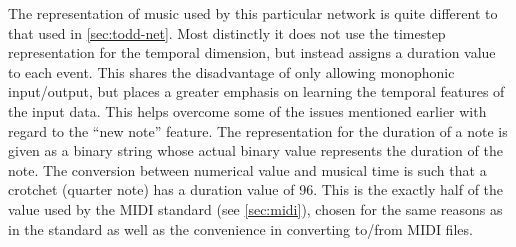 \documentclass[ author={Stephen Livermore-Tozer},
				supervisor={Dr. Peter Flach},
				degree={MEng},
				title={Algorithmic Co-composition Using Machine Learning},
				subtitle={},
				type={research},
				year={2016} ]{dissertation}
\begin{document}
	
	The representation of music used by this particular network is quite different to that used in \ref{sec:todd-net}. Most distinctly it does not use the timestep representation for the temporal dimension, but instead assigns a duration value to each event. This shares the disadvantage of only allowing monophonic input/output, but places a greater emphasis on learning the temporal features of the input data. This helps overcome some of the issues mentioned earlier with regard to the ``new note'' feature. The representation for the duration of a note is given as a binary string whose actual binary value represents the duration of the note. The conversion between numerical value and musical time is such that a crotchet (quarter note) has a duration value of 96. This is the exactly half of the value used by the MIDI standard (see \ref{sec:midi}), chosen for the same reasons as in the standard as well as the convenience in converting to/from MIDI files.
	
\end{document}
